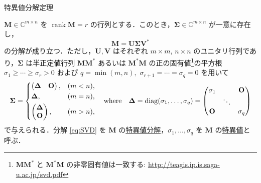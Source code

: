 \documentclass[uplatex,11pt,dvipdfmx,aspectratio=169,unicode,t]{beamer}
\numberwithin{equation}{section}
\newcommand{\BC}{\mathbb{C}}
\newcommand{\mb}[1]{\mathbf{#1}}
\newcommand{\1}{\bs{1}}
\newcommand{\0}{\bs{0}}
\DeclareMathOperator*{\rank}{rank}
\DeclareMathOperator*{\diag}{diag}
\begin{document}
\begin{frame}{特異値分解定理}
    \footnotesize
    \begin{theorem}
        $\mb{M} \in \BC^{m \times n}$ を $\rank \mb{M} = r$ の行列とする．このとき，$\mb{\Sigma} \in \BC^{m \times n}$ が一意に存在し，
        \begin{equation} \label{eq:SVD}
            \mb{M} = \mb{U} \mb{\Sigma} \mb{V}^{\ast}
        \end{equation}
        の分解が成り立つ．ただし，$\mb{U},\mb{V}$ はそれぞれ $m \times m$, $n \times n$ のユニタリ行列であり，$\mb{\Sigma}$ は半正定値行列 $\mb{M}\mb{M}^{\ast}$ あるいは $\mb{M}^{\ast}\mb{M}$ の正の固有値\footnote{$\mb{M}\mb{M}^{\ast}$ と $\mb{M}^{\ast}\mb{M}$ の非零固有値は一致する: \url{http://teagis.ip.is.saga-u.ac.jp/svd.pdf}}の平方根 $\sigma_{1} \ge \cdots \ge \sigma_{r} > 0$ および $q = \min(m,n),$ $\sigma_{r+1} = \cdots = \sigma_{q} = 0$ を用いて
        \begin{equation}
            \mb{\Sigma} = \begin{dcases}
                \begin{pmatrix}
                    \mb{\Delta} & \mb{O} 
                \end{pmatrix}, & (m < n),\\
                \mb{\Delta}, & (m = n), \\
                \begin{pmatrix}
                    \mb{\Delta} \\
                    \mb{O}
                \end{pmatrix}, & (m > n),
            \end{dcases} \quad \text{where} \quad \mb{\Delta} = \diag(\sigma_{1},\ldots,\sigma_{q}) = \begin{pmatrix}
                \sigma_{1} & & \mb{O} \\
                & \ddots & \\
                \mb{O} & & \sigma_{q}
            \end{pmatrix}
        \end{equation}
        で与えられる．分解 \eqref{eq:SVD} を $\mb{M}$ の\underline{特異値分解}，$\sigma_{1},\ldots,\sigma_{q}$ を $\mb{M}$ の\underline{特異値}と呼ぶ．
    \end{theorem}
\end{frame}
\end{document}
